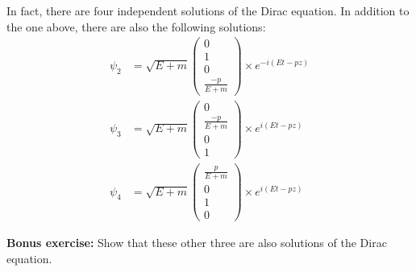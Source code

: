 \documentclass[a4paper,11pt]{article}
\numberwithin{equation}{section} %
\begin{document}
In fact, there are four independent solutions of the Dirac equation.
In addition to the one above, there are also the following solutions:
\begin{align}
\psi_2 &= \sqrt{E+m} \begin{pmatrix} 0 \\ 1 \\ 0 \\ \frac{-p}{E+m} \end{pmatrix} \times e^{-i (E t - p z)}
\\
\psi_3 &= \sqrt{E+m} \begin{pmatrix} 0 \\ \frac{-p}{E+m} \\ 0 \\ 1 \end{pmatrix} \times e^{i (E t - p z)}
\\
\psi_4 &= \sqrt{E+m} \begin{pmatrix} \frac{p}{E+m} \\ 0 \\ 1 \\ 0 \end{pmatrix} \times e^{i (E t  -p z)}
\end{align}


\textbf{Bonus exercise:} Show that these other three are also solutions of the Dirac equation.
\end{document}
